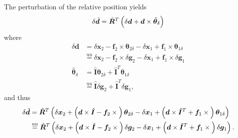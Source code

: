 \documentclass[10pt,dvips,fleqn,subeqn]{report}
\newcommand{\T}[1]{\bm{#1}}
\newcommand{\TT}[1]{\bm{#1}}
\newcommand{\equu}{\overset{\text{uu}}{=}}
\begin{document}
The perturbation of the relative position yields
\begin{equation}
	\delta\tilde{\T{d}} = \hat{\TT{R}}^T \plbr{
		\delta\T{d} + \T{d} \times \hat{\T{\theta}}_{\delta}
	}
\end{equation}
where
\begin{subequations}
\begin{align}
	\delta\T{d}
	&= \delta\T{x}_2 - \T{f}_2 \times \T{\theta}_{2\delta}
		- \delta\T{x}_1 + \T{f}_1 \times \T{\theta}_{1\delta}
		\nonumber \\
	&\equu \delta\T{x}_2 - \T{f}_2 \times \delta\T{g}_2
		- \delta\T{x}_1 + \T{f}_1 \times \delta\T{g}_1
	\\
	\hat{\T{\theta}}_{\delta}
	&= \hat{\TT{I}} \T{\theta}_{2\delta} + \hat{\TT{I}}^T \T{\theta}_{1\delta}
		\nonumber \\
	&\equu \hat{\TT{I}} \delta\T{g}_2 + \hat{\TT{I}}^T \delta\T{g}_1 ,
\end{align}
\end{subequations}
and thus
\begin{align}
	\delta\tilde{\T{d}} 
	&= \hat{\TT{R}}^T \plbr{
		\delta\T{x}_2
		+ \plbr{
			\T{d}\times\hat{\TT{I}}
			- \T{f}_2 \times{}
		} \T{\theta}_{2\delta}
		- \delta\T{x}_1
		+ \plbr{
			\T{d}\times\hat{\TT{I}}^T
			+ \T{f}_1 \times{}
		} \T{\theta}_{1\delta}
	}
	\nonumber \\
	&\equu \hat{\TT{R}}^T \plbr{
		\delta\T{x}_2
		+ \plbr{
			\T{d}\times\hat{\TT{I}}
			- \T{f}_2 \times{}
		} \delta\T{g}_2
		- \delta\T{x}_1
		+ \plbr{
			\T{d}\times\hat{\TT{I}}^T
			+ \T{f}_1 \times{}
		} \delta\T{g}_1
	}
	.
\end{align}
\end{document}

